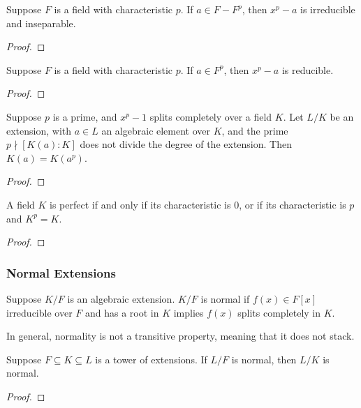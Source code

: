 \begin{lemma}
    Suppose \(F\) is a field with characteristic \(p\).
    If \(a \in F - F^p\), then \(x^p - a\) is irreducible and inseparable.
\end{lemma}
\begin{proof}
\end{proof}
\begin{lemma}
    Suppose \(F\) is a field with characteristic \(p\).
    If \(a \in F^p\), then \(x^p - a\) is reducible.
\end{lemma}
\begin{proof}
\end{proof}
\begin{proposition}
    Suppose \(p\) is a prime,
    and \(x^p - 1\) splits completely over a field \(K\).
    Let \(L/K\) be an extension, with \(a \in L\) an algebraic element over \(K\),
    and the prime \(p \nmid [K(a):K]\) does not divide the degree of the extension.
    Then \(K(a) = K(a^p)\).
\end{proposition}
\begin{proof}
\end{proof}
\begin{theorem}
    A field \(K\) is perfect
    if and only if its characteristic is 0,
    or if its characteristic is \(p\) and \(K^p = K\).
\end{theorem}
\begin{proof}
\end{proof}

\subsubsection*{Normal Extensions}

\begin{definition}
    Suppose \(K/F\) is an algebraic extension.
    \(K/F\) is normal if \(f(x) \in F[x]\) irreducible over \(F\)
    and has a root in \(K\) implies \(f(x)\) splits completely in \(K\).
\end{definition}
\begin{remark}
    In general, normality is not a transitive property,
    meaning that it does not stack.
\end{remark}

\begin{theorem}
    Suppose \(F \subseteq K \subseteq L\) is a tower of extensions.
    If \(L/F\) is normal, then \(L/K\) is normal.
\end{theorem}
\begin{proof}
\end{proof}

